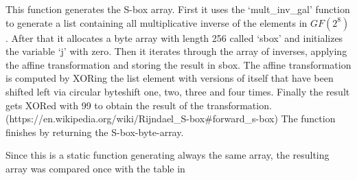 This function generates the S-box array. First it uses the
`mult\_inv\_gal' function to generate a list containing all
multiplicative inverse of the elements in $GF(2^{8})$. After that it
allocates a byte array with length 256 called `sbox' and initializes the
variable `j' with zero. Then it iterates through the array of inverses,
applying the affine transformation and storing the result in sbox. The
affine transformation is computed by XORing the list element with
versions of itself that have been shifted left via circular byteshift
one, two, three and four times. Finally the result gets XORed with 99 to
obtain the result of the transformation.
(https://en.wikipedia.org/wiki/Rijndael\_S-box\#forward\_s-box) The
function finishes by returning the S-box-byte-array.

Since this is a static function generating always the same array, the
resulting array was compared once with the table in \cite[Fig. 7]{aes2001}
